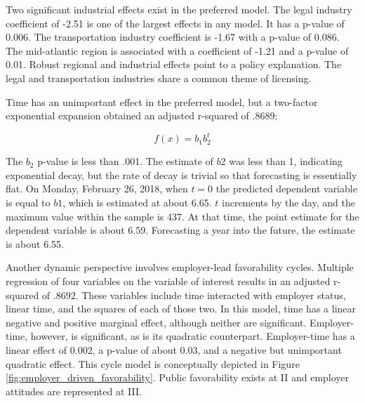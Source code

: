 \documentclass[review]{elsarticle}
\begin{document}
        Two significant industrial effects exist in the preferred model.
        The legal industry coefficient of -2.51 is one of the largest effects in any model.
        It has a p-value of 0.006.
        The transportation industry coefficient is -1.67 with a p-value of 0.086.
        The mid-atlantic region is associated with a coefficient of -1.21 and a p-value of 0.01.
        Robust regional and industrial effects point to a policy explanation.
        The legal and transportation industries share a common theme of licensing.
        
        Time has an unimportant effect in the preferred model,
        but a two-factor exponential expansion obtained an adjusted r-squared of .8689:
        
        \begin{equation} f(x) = b_1b_2^t \end{equation}
        
        The $b_2$ p-value is less than .001. The estimate of $b2$ was less than 1, indicating exponential
        decay, but the rate of decay is trivial so that forecasting is essentially flat.
        On Monday, February 26, 2018, when $t=0$ the predicted dependent variable is equal to $b1$, which is estimated at about 6.65.
        $t$ increments by the day, and the maximum value within the sample is 437. At that time, the point estimate
        for the dependent variable is about 6.59. Forecasting a year into the future, the estimate is about 6.55.
        
        Another dynamic perspective involves employer-lead favorability cycles.
        Multiple regression of four variables on the variable of interest results in an adjusted r-squared of .8692.
        These variables include time interacted with employer status, linear time, and the squares of each of
        those two.
        In this model, time has a linear negative and positive marginal effect, although neither are significant.
        Employer-time, however, is significant, as is its quadratic counterpart.
        Employer-time has a linear effect of 0.002, a p-value of about 0.03, and a negative but unimportant
        quadratic effect.
        This cycle model is conceptually depicted in Figure \ref{fig:employer_driven_favorability}.
        Public favorability exists at II and employer attitudes are represented at III.
        
\end{document}
